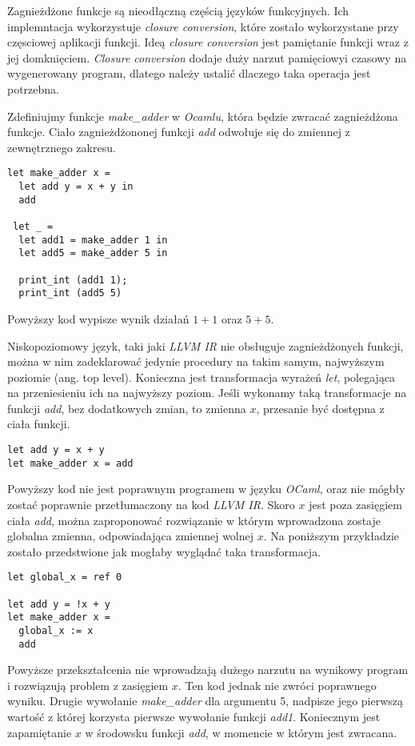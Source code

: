 \documentclass[declaration,shortabstract]{iithesis}
\begin{document}
Zagnieżdżone funkcje są nieodłączną częścią języków funkcyjnych. Ich implemntacja wykorzystuje 
\textit{closure conversion}, które zostało wykorzystane przy częsciowej aplikacji funkcji. 
Ideą \textit{closure conversion} jest pamiętanie funkcji wraz z jej domknięciem. 
\textit{Closure conversion} dodaje duży narzut pamięciowyi czasowy na wygenerowany program,
dlatego należy ustalić dlaczego taka operacja jest potrzebna.

Zdefiniujmy funkcje \textit{make_adder} w \textit{Ocamlu}, która będzie zwracać zagnieżdżona funkcje.
Ciało zagnieżdżononej funkcji \textit{add} odwołuje się do zmiennej z zewnętrznego zakresu.

\begin{lstlisting}[frame=single, caption={Zagnieżdżona funkcja w \textit{OCamlu}}]
let make_adder x = 
  let add y = x + y in 
  add 
  
 let _ = 
  let add1 = make_adder 1 in 
  let add5 = make_adder 5 in 
  
  print_int (add1 1);
  print_int (add5 5) 
\end{lstlisting}
Powyższy kod wypisze wynik działań $1 + 1$ oraz $5 + 5$. 

Niskopoziomowy język, taki jaki \textit{LLVM IR} nie obsługuje zagnieżdżonych funkcji, można w
nim zadeklarować jedynie procedury na takim samym, najwyższym poziomie (ang. top level). 
Konieczna jest transformacja wyrażeń \textit{let}, polegająca na przeniesieniu ich na najwyższy poziom. 
Jeśli wykonamy taką transformacje na funkcji \textit{add}, bez dodatkowych zmian, to zmienna $x$,
przesanie być dostępna z ciała funkcji.

\begin{lstlisting}[frame=single, caption={Po przeniesieniu funkcji \textit{add} na najwyższy poziom}]
let add y = x + y 
let make_adder x = add 
\end{lstlisting}

Powyższy kod nie jest poprawnym programem w języku \textit{OCaml}, oraz 
nie mógbły zostać poprawnie przetłumaczony na kod \textit{LLVM IR}. 
Skoro $x$ jest poza zasięgiem ciała \textit{add}, można zaproponować rozwiązanie w którym 
wprowadzona zostaje globalna zmienna, odpowiadająca zmiennej wolnej $x$. 
Na poniższym przykładzie zostało przedstwione jak mogłaby wyglądać taka transformacja.

\begin{lstlisting}[frame=single, caption={Wprowadzenie globalnej zmiennej.}]
let global_x = ref 0

let add y = !x + y 
let make_adder x = 
  global_x := x
  add 
\end{lstlisting}
Powyższe przekształcenia nie wprowadzają dużego narzutu na wynikowy program i rozwiązują 
problem z zasięgiem $x$. Ten kod jednak nie zwróci poprawnego wyniku. Drugie 
wywołanie \textit{make_adder} dla argumentu 5, nadpisze jego pierwszą wartość z której korzysta
pierwsze wywołanie funkcji \textit{add1}. Koniecznym jest zapamiętanie $x$ w środowsku funkcji 
\textit{add}, w momencie w którym jest zwracana. 
\end{document}
